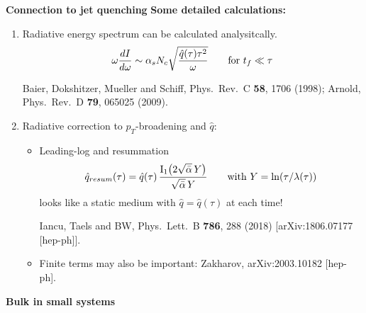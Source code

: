 \documentclass[9pt,a4paper,unknownkeysallowed,xcolor=dvipsnames,aspectratio=43]{beamer}
\newcommand{\abar}{\bar{\alpha}}
\newcommand{\rmI}{{\rm I}}
\begin{document}
\begin{frame}{\bf\huge Connection to jet quenching}	\vspace{2mm}
{\large\bf Some detailed calculations:}
\vspace{2mm}
\begin{enumerate}
    \item{\large Radiative energy spectrum can be calculated analysitcally.}
    \begin{align}
        \omega\frac{dI}{d\omega} \sim \alpha_s N_c \sqrt{\frac{\hat{q}(\tau)\tau^2}{\omega}}
        \qquad\text{for $t_f \ll \tau$}\notag
    \end{align}
\begin{center}
    {\tiny  {\color{teablue}
  Baier, Dokshitzer, Mueller and Schiff,
  Phys.\ Rev.\ C {\bf 58}, 1706 (1998); Arnold,
  Phys.\ Rev.\ D {\bf 79}, 065025 (2009).
}}    
\end{center}
\vspace{2mm}
    \item{\large Radiative correction to $p_T$-broadening and $\hat{q}$:}\\
    \vspace{2mm}
    \begin{itemize}
        \item{Leading-log and resummation}
        \begin{align}
        \hat{q}_{resum}(\tau) = \hat{q}(\tau)\,
        \frac{\rmI_1\big(2 \sqrt{\abar}\, Y\big)}{\sqrt{\abar}\,Y}\qquad\text{with $Y=\ln(\tau/\lambda(\tau))$}\notag
        \end{align}
        looks like a static medium with $\hat{q} = \hat{q}(\tau)$ at each time!\\
\begin{center}
    {\tiny  {\color{teablue}
  Iancu, Taels and BW,
  Phys.\ Lett.\ B {\bf 786}, 288 (2018)
  [arXiv:1806.07177 [hep-ph]].
  }}
\end{center}
    \vspace{2mm}
        \item{Finite terms may also be important: {\tiny  {\color{teablue}
  Zakharov,
  arXiv:2003.10182 [hep-ph].
}}
}
    \end{itemize}
\end{enumerate}
\end{frame}
%
%
\setcounter{page}{0}
\begin{frame}
\vspace*{\fill}
\begin{center}
{\Huge\bf\color{gray} Bulk in small systems}
\end{center}
\vspace*{\fill}
\end{frame}
\end{document}
